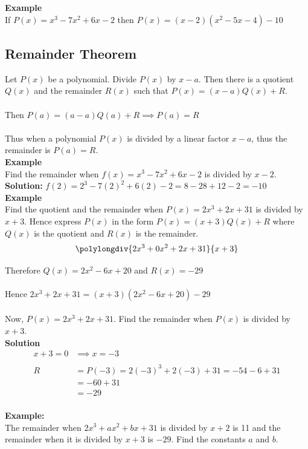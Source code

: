 \documentclass[11pt,a4paper]{article}
\begin{document}
\textbf{Example}\\
If $P(x)=x^3-7x^2+6x-2$ then $P(x)=(x-2)(x^2-5x-4)-10$\\


\subsection{Remainder Theorem}
Let $P(x)$ be a polynomial. Divide $P(x)$ by $x-a$. Then there is a quotient $Q(x)$ and the remainder $R(x)$ such that $P(x)=(x-a)Q(x)+R$.\\\\ Then $P(a)=(a-a)Q(a)+R\implies P(a)=R$\\\\
Thus when a polynomial $P(x)$ is divided by a linear factor $x-a$, thus the remainder is $P(a)=R$.\\

\textbf{Example}\\
Find the remainder when $f(x)=x^3-7x^2+6x-2$ is divided by $x-2$.\\

\textbf{Solution:}
$f(2)=2^3-7(2)^2+6(2)-2=8-28+12-2 =-10$\\


\textbf{Example}\\
Find the quotient and the remainder when $P(x)=2x^3+2x+31$ is divided by $x+3$. Hence express $P(x)$ in the form $P(x)=(x+3)Q(x)+R$ where $Q(x)$ is the quotient and $R(x)$ is the remainder.
$$\polylongdiv{2x^3+0x^2+2x+31}{x+3}$$

Therefore $Q(x)=2x^2-6x+20$ and $R(x)=-29$\\\\
Hence $2x^3+2x+31=(x+3)(2x^2-6x+20)-29$\\\\


Now, $P(x)=2x^3+2x+31$. Find the remainder when $P(x)$ is divided by $x+3$.\\

\textbf{Solution}
\begin{align*}
x+3=0 & \implies x=-3\\\\
R & = P(-3) = 2(-3)^3+2(-3)+31=-54-6+31\\
  & = -60 + 31\\
  & = -29\\
\end{align*}



\textbf{Example:}\\
The remainder when $2x^3+ax^2+bx+31$ is divided by $x+2$ is 11 and the remainder when it is divided by $x+3$ is $-29$. Find the constants $a$ and $b$.\\
\end{document}
